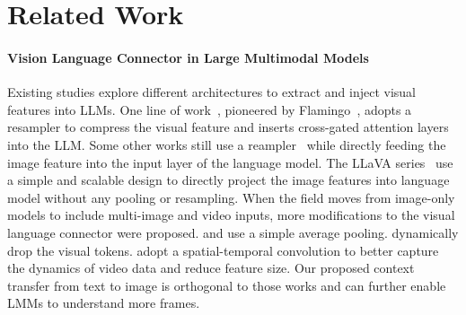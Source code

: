 \section{Related Work}
	
\paragraph{Vision Language Connector in Large Multimodal Models}
Existing studies explore different architectures to extract and inject visual features into LLMs. One line of work~\citep{flamingo, li2023otter, open_flamingo, laurençon2023obelics}, pioneered by Flamingo~\cite{flamingo}, adopts a resampler to compress the visual feature and inserts cross-gated attention layers into the LLM. Some other works still use a reampler~\citep{li2023blip2, zhu2023minigpt4, qwenvl2024} while directly feeding the image feature into the input layer of the language model. The LLaVA series~\citep{liu2024llavanext, liu2023improvedllava, liu2023llava} use a simple and scalable design to directly project the image features into language model without any pooling or resampling. When the field moves from image-only models to include multi-image and video inputs, more modifications to the visual language connector were proposed. \cite{zhang2024llavanextvideo} and \cite{cai2024matryoshka} use a simple average pooling. \cite{jin2024chatunivi} dynamically drop the visual tokens. \cite{cheng2024videollama} adopt a spatial-temporal convolution to better capture the dynamics of video data and reduce feature size. Our proposed context transfer from text to image is orthogonal to those works and can further enable LMMs to understand more frames. 

